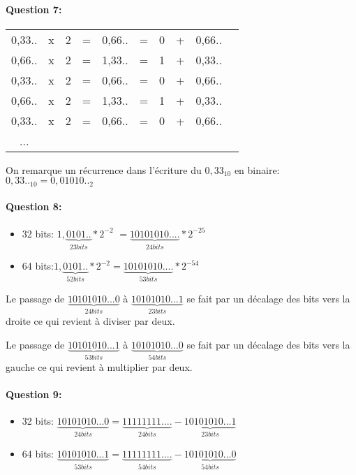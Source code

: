 \paragraph{Question 7:}

\begin{tabular}{c c c c c c c c c c}
0,33.. & x & 2 & = & 0,66.. & = &  0 & + & 0,66.. \\
0,66.. & x & 2 & = & 1,33.. & = &  1 & + & 0,33.. \\
0,33.. & x & 2 & = & 0,66.. & = &  0 & + & 0,66.. \\
0,66.. & x & 2 & = & 1,33.. & = &  1 & + & 0,33.. \\
0,33.. & x & 2 & = & 0,66.. & = &  0 & + & 0,66.. \\
...
\end{tabular}

On remarque un récurrence dans l'écriture du $0,33_{10}$ en binaire: $0,33.._{10}=0,01010.._2$

\paragraph{Question 8:}
\begin{itemize}
 \item 32 bits: $1,\underbrace{0101..}_{23 bits}*2^{-2}$ $=\underbrace{10101010....}_{24 bits}*2^{-25}$
 \item 64 bits:$1,\underbrace{0101..}_{52 bits}*2^{-2}=\underbrace{10101010....}_{53 bits}*2^{-54}$
\end{itemize}

Le passage de $\underbrace{10101010...0}_{24 bits}$ à $\underbrace{10101010...1}_{23 bits}$ se fait par un décalage des bits vers la droite ce qui revient à diviser par deux.

Le passage de $\underbrace{10101010...1}_{53 bits}$ à $\underbrace{10101010...0}_{54 bits}$ se fait par un décalage des bits vers la gauche ce qui revient à multiplier par deux.

\paragraph{Question 9:}
\begin{itemize}
 \item 32 bits: $\underbrace{10101010...0}_{24 bits}=\underbrace{11111111....}_{24 bits}-\underbrace{10101010...1}_{23 bits}$
 \item 64 bits: $\underbrace{10101010...1}_{53 bits}=\underbrace{11111111....}_{54 bits}-\underbrace{10101010...0}_{54 bits}$
\end{itemize}

